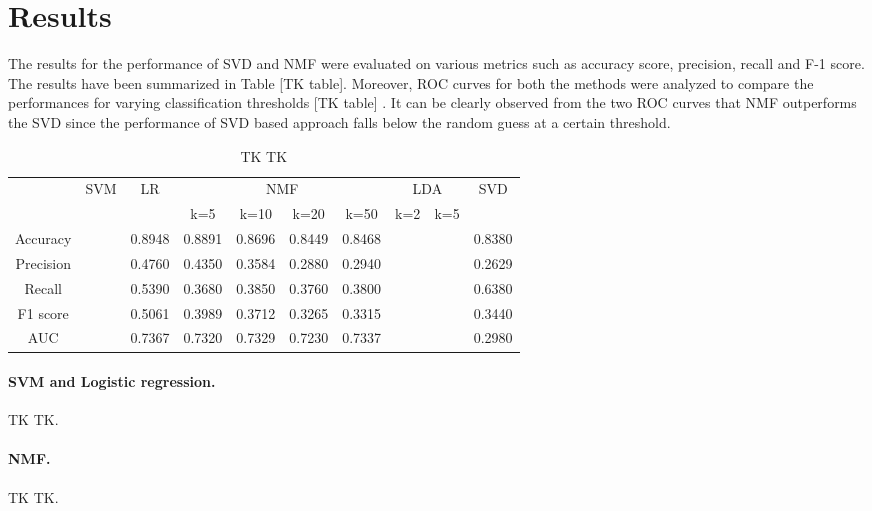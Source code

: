 \documentclass{article} %
\begin{document}
\section{Results}

The results for the performance of SVD and NMF were evaluated on various metrics such as accuracy score, precision, recall and F-1 score. The results have been summarized in Table [TK table]. Moreover, ROC curves for both the methods were analyzed to compare the performances for varying classification thresholds [TK table] . It can be clearly observed from the two ROC curves that NMF outperforms the SVD since the performance of SVD based approach falls below the random guess at a certain threshold.

\begin{table}
\centering
{
\fontsize{10}{12}\selectfont
\noindent\begin{tabular}{ c | c | c | c c c c | c c | c }
	\hline
	& \multirow{2}{*}{SVM}
	    & \multirow{2}{*}{LR}
	    & \multicolumn{4}{c|}{NMF}
	    & \multicolumn{2}{c|}{LDA}
	    & \multirow{2}{*}{SVD} \\
	\cline{4-9}
    & & & k=5 & k=10 & k=20 & k=50 & k=2 & k=5 \\
	\hline
	\hline
	Accuracy  & & 0.8948 & 0.8891 & 0.8696 & 0.8449 & 0.8468 & & & 0.8380 \\
	\hline
	Precision & & 0.4760 & 0.4350 & 0.3584 & 0.2880 & 0.2940 & & & 0.2629 \\
	\hline
	Recall    & & 0.5390 & 0.3680 & 0.3850 & 0.3760 & 0.3800 & & & 0.6380 \\
	\hline
	F1 score  & & 0.5061 & 0.3989 & 0.3712 & 0.3265 & 0.3315 & & & 0.3440 \\
	\hline
	AUC       & & 0.7367 & 0.7320 & 0.7329 & 0.7230 & 0.7337 & & & 0.2980 \\
	\hline
\end{tabular}
}
\caption{\small TK TK}
\label{tab:standardresults}
\end{table}

\paragraph{SVM and Logistic regression.} TK TK.

\paragraph{NMF.} TK TK.
\end{document}

